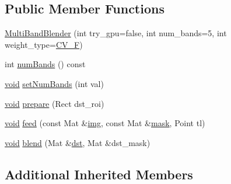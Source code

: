 \subsection*{Public Member Functions}
\begin{DoxyCompactItemize}
\item 
\hyperlink{classcv_1_1detail_1_1MultiBandBlender_a22b424c9587d07da189cd1f15c664424}{Multi\-Band\-Blender} (int try\-\_\-gpu=false, int num\-\_\-bands=5, int weight\-\_\-type=\hyperlink{core_2types__c_8h_a4a3def5d72b74bed31f5f8ab7676099c}{C\-V\-\_\-F})
\item 
int \hyperlink{classcv_1_1detail_1_1MultiBandBlender_a842e50c7e69d769470d91661dccb71ae}{num\-Bands} () const 
\item 
\hyperlink{legacy_8hpp_a8bb47f092d473522721002c86c13b94e}{void} \hyperlink{classcv_1_1detail_1_1MultiBandBlender_a2efd19181426ba017b23c24c88666188}{set\-Num\-Bands} (int val)
\item 
\hyperlink{legacy_8hpp_a8bb47f092d473522721002c86c13b94e}{void} \hyperlink{classcv_1_1detail_1_1MultiBandBlender_a40907c07723dce1ea47d23d529b74ae3}{prepare} (Rect dst\-\_\-roi)
\item 
\hyperlink{legacy_8hpp_a8bb47f092d473522721002c86c13b94e}{void} \hyperlink{classcv_1_1detail_1_1MultiBandBlender_a80820aaf651dfab3da39fa7198fbb6e2}{feed} (const Mat \&\hyperlink{legacy_8hpp_a5349238b3772bed6eae0fda3117ccfef}{img}, const Mat \&\hyperlink{tracking_8hpp_a6b13ecd2fd6ec7ad422f1d7863c3ad19}{mask}, Point tl)
\item 
\hyperlink{legacy_8hpp_a8bb47f092d473522721002c86c13b94e}{void} \hyperlink{classcv_1_1detail_1_1MultiBandBlender_aca24a82107a4d76cd4cb0c75b80d09df}{blend} (Mat \&\hyperlink{photo__c_8h_aed13e2a25279b24dc954073233fef7a5}{dst}, Mat \&dst\-\_\-mask)
\end{DoxyCompactItemize}
\subsection*{Additional Inherited Members}


